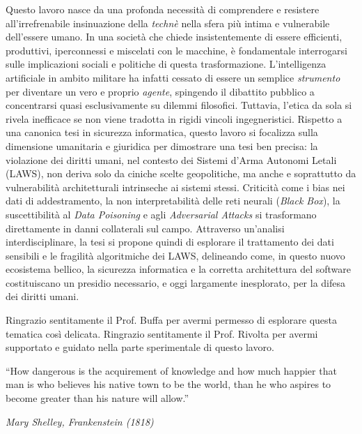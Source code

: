 \documentclass[a4paper,12pt]{report}
\begin{document}
Questo lavoro nasce da una profonda necessità di comprendere e resistere all'irrefrenabile insinuazione della \textit{technè} nella sfera più intima e vulnerabile dell'essere umano. In una società che chiede insistentemente di essere efficienti, produttivi, iperconnessi e miscelati con le macchine, è fondamentale interrogarsi sulle implicazioni sociali e politiche di questa trasformazione.
L'intelligenza artificiale in ambito militare ha infatti cessato di essere un semplice \textit{strumento} per diventare un vero e proprio \textit{agente}, spingendo il dibattito pubblico a concentrarsi quasi esclusivamente su dilemmi filosofici. Tuttavia, l'etica da sola si rivela inefficace se non viene tradotta in rigidi vincoli ingegneristici.
Rispetto a una canonica tesi in sicurezza informatica, questo lavoro si focalizza sulla dimensione umanitaria e giuridica per dimostrare una tesi ben precisa: la violazione dei diritti umani, nel contesto dei Sistemi d'Arma Autonomi Letali (LAWS), non deriva solo da ciniche scelte geopolitiche, ma anche e soprattutto da vulnerabilità architetturali intrinseche ai sistemi stessi. Criticità come i bias nei dati di addestramento, la non interpretabilità delle reti neurali (\textit{Black Box}), la suscettibilità al \textit{Data Poisoning} e agli \textit{Adversarial Attacks} si trasformano direttamente in danni collaterali sul campo.
Attraverso un'analisi interdisciplinare, la tesi si propone quindi di esplorare il trattamento dei dati sensibili e le fragilità algoritmiche dei LAWS, delineando come, in questo nuovo ecosistema bellico, la sicurezza informatica e la corretta architettura del software costituiscano un presidio necessario, e oggi largamente inesplorato, per la difesa dei diritti umani.

Ringrazio sentitamente il Prof. Buffa per avermi permesso di esplorare questa tematica così delicata. 
Ringrazio sentitamente il Prof. Rivolta per avermi supportato e guidato nella parte sperimentale di questo lavoro.


\afterpreface


\begin{flushright}
\begin{minipage}{0.6\textwidth}
\epigraph{
    ``How dangerous is the acquirement of knowledge and how much happier that man is who believes his native town to be the world, than he who aspires to become greater than his nature will allow.''
}{\textit{Mary Shelley, Frankenstein (1818)}}
\end{minipage}
\end{flushright}
 
\end{document}
